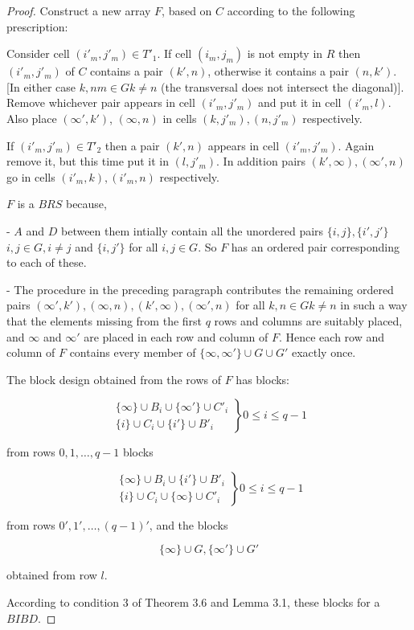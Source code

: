 \documentclass[
  11pt,
  a4paper]{book}
\begin{document}
\begin{proof}
Construct a new array $F$, based on $C$ according to the
following prescription:

Consider cell $(i'_m, j'_m) \in T'_1$. If cell $(i_m, j_m)$ is
not empty in $R$ then $(i'_m, j'_m)$ of $C$ contains a pair
$(k', n)$, otherwise it contains a pair $(n, k')$. [In either
case $k, nm \in G k \neq n$ (the transversal
does not intersect the diagonal)]. Remove whichever pair
appears in cell $(i'_m, j'_m)$ and put it in cell $(i'_m, l)$.
Also place $(\infty', k')$, $(\infty, n)$ in cells
$(k, j'_m), (n, j'_m)$ respectively.

If $(i'_m, j'_m) \in T'_2$ then a pair $(k', n)$ appears in
cell $(i'_m, j'_m)$. Again remove it, but this time put it in
$(l, j'_m)$. In addition pairs $(k', \infty), (\infty ', n)$ go
in cells $(i'_m, k), (i'_m, n)$ respectively.

$F$ is a $BRS$ because,

  - $A$ and $D$ between them intially contain all the
    unordered pairs $\{i, j\}, \{i', j'\}$
    $i, j \in G, i\neq j$ and
    $\{i,j'\}$ for all $i,j \in G$. So $F$ has an
    ordered pair corresponding to each of these.

  - The procedure in the preceding paragraph contributes
    the remaining ordered pairs
    $(\infty', k'),(\infty,n),(k',\infty),(\infty ',n)$ for all $k,n \in G k \neq n$
    in such a way that the
    elements missing from the first $q$ rows and columns are
    suitably placed, and $\infty$ and $\infty '$ are placed
    in each row and column of $F$.  Hence each row and
    column of $F$ contains every member of
    $\{\infty, \infty '\} \cup G \cup G'$
    exactly once.

The block design obtained from the rows of $F$ has blocks:

\begin{equation}
\left.
\begin{split}
\{\infty\} \cup B_i \cup \{\infty'\} \cup C'_i \\
\{i\} \cup C_i \cup \{i'\} \cup B'_i
\end{split}
\right \}
0 \leq i \leq q-1
\end{equation}

from rows $0, 1, \ldots, q - 1$ blocks

\begin{equation}
\left.
\begin{split}
\{\infty\} \cup B_i \cup \{i'\} \cup B'_i \\
\{i\} \cup C_i \cup \{\infty\} \cup C'_i
\end{split}
\right \}
0 \leq i \leq q-1
\end{equation}

from rows $0', 1', \ldots, (q - 1)'$, and the blocks

\begin{equation}
\{\infty\} \cup G, \{\infty '\} \cup G'
\end{equation}

obtained from row $l$.

According to condition 3 of Theorem 3.6 and Lemma 3.1, these
blocks for a $BIBD$.
\end{proof}
\end{document}
